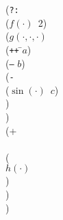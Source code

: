 \begin{tabbing}
(\texttt{?:}\=\\
   \> ($f(·)$~2)\\
   \> ($g(·,·,·)$\=\\
    \> \> (\texttt{++} \=$a$)\\
     \> \> (\texttt{--} \>$b$)\\
      \> \> (\texttt{-}\=\\
      \> \> \> ($\sin(·)$~$c$)\\
      \>\>)\\
    \>)\\
    \> (+\\
    \> \\
      \>\>(\\
      \>\>\>$h(·)$\\
         \>\>)\\
    \>)\\
)
\end{tabbing}
